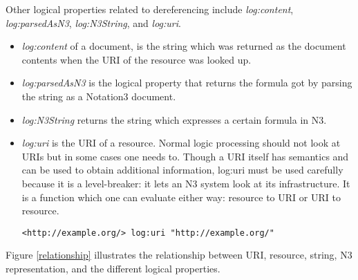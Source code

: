 \documentclass{tlp}
\begin{document}
Other logical properties related to dereferencing include {\it
  log:content}, {\it log:parsedAsN3}, {\it log:N3String}, and {\it
  log:uri}.

\begin{itemize}

\item {\it log:content} of a document, is the string which was
  returned as the document contents when the URI of the resource was
  looked up.

\item {\it log:parsedAsN3} is the logical property that returns the
  formula got by parsing the string as a Notation3 document.

\item {\it log:N3String} returns the string which expresses a certain
  formula in N3.

\item {\it log:uri} is the URI of a resource. Normal logic processing
  should not look at URIs but in some cases one needs to. Though a URI
  itself has semantics and can be used to obtain additional
  information, log:uri must be used carefully because it is a
  level-breaker: it lets an N3 system look at its infrastructure. It
  is a function which one can evaluate either way: resource to URI or
  URI to resource.


\begin{verbatim}
<http://example.org/> log:uri "http://example.org/"
\end{verbatim}


\end{itemize}

Figure \ref{relationship} illustrates the relationship between URI,
resource, string, N3 representation, and the different logical
properties.



\end{document}
